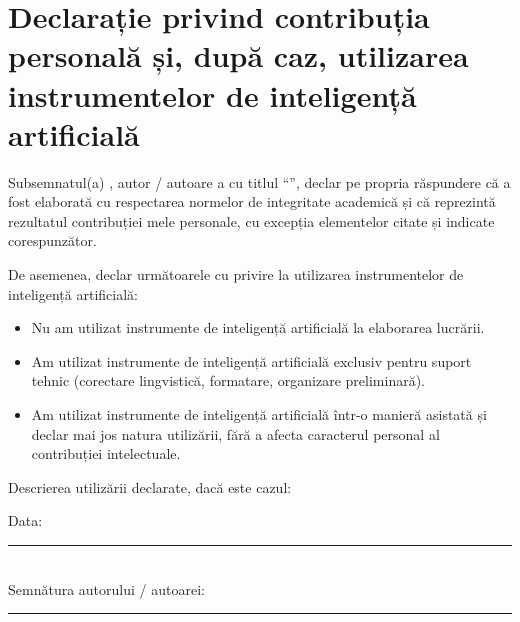 \chapter*{Declarație privind contribuția personală și, după caz, utilizarea instrumentelor de inteligență artificială}%
\label{declaratie_ro}%

Subsemnatul(a) \textbf{\authorName{}}, autor / autoare a \docTypeRoDativ{} cu titlul
``\textit{\docTitleRo{}}'',
declar pe propria răspundere că \docTypeRoDefinit{} a fost elaborată
cu respectarea normelor de integritate academică și că reprezintă
rezultatul contribuției mele personale, cu excepția elementelor citate
și indicate corespunzător.

De asemenea, declar următoarele cu privire la utilizarea instrumentelor
de inteligență artificială:

\begin{itemize}
  \item[\aiUsageBox{none}] Nu am utilizat instrumente de inteligență artificială la elaborarea lucrării.
  \item[\aiUsageBox{text}] Am utilizat instrumente de inteligență artificială exclusiv pentru suport tehnic (corectare lingvistică, formatare, organizare preliminară).
  \item[\aiUsageBox{assisted}] Am utilizat instrumente de inteligență artificială într-o manieră asistată și declar mai jos natura utilizării, fără a afecta caracterul personal al contribuției intelectuale.
\end{itemize}

Descrierea utilizării declarate, dacă este cazul:

\aiTextLines{\aiAssistanceExplanation}

\begin{flushleft}
  Data: \rule{4cm}{0.4pt} \\
  Semnătura autorului / autoarei: \rule{4cm}{0.4pt}
\end{flushleft}
